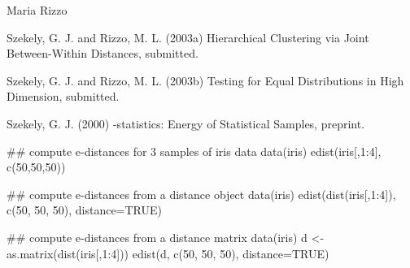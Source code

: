 \documentclass{article}
\begin{document}
\begin{Author}\relax
Maria Rizzo 
\end{Author}
\begin{References}\relax
Szekely, G. J. and Rizzo, M. L. (2003a) Hierarchical Clustering
via Joint Between-Within Distances, submitted.

Szekely, G. J. and Rizzo, M. L. (2003b) Testing for Equal
Distributions in High Dimension, submitted.

Szekely, G. J. (2000) -statistics: Energy of 
Statistical Samples, preprint.\end{References}
\begin{SeeAlso}\relax
{}
 
\end{SeeAlso}
\begin{Examples}
\begin{ExampleCode}
 ## compute e-distances for 3 samples of iris data
 data(iris)
 edist(iris[,1:4], c(50,50,50))

 ## compute e-distances from a distance object
 data(iris)
 edist(dist(iris[,1:4]), c(50, 50, 50), distance=TRUE)

 ## compute e-distances from a distance matrix
 data(iris)
 d <- as.matrix(dist(iris[,1:4]))
 edist(d, c(50, 50, 50), distance=TRUE) 
\end{ExampleCode}
\end{Examples}
\end{document}
